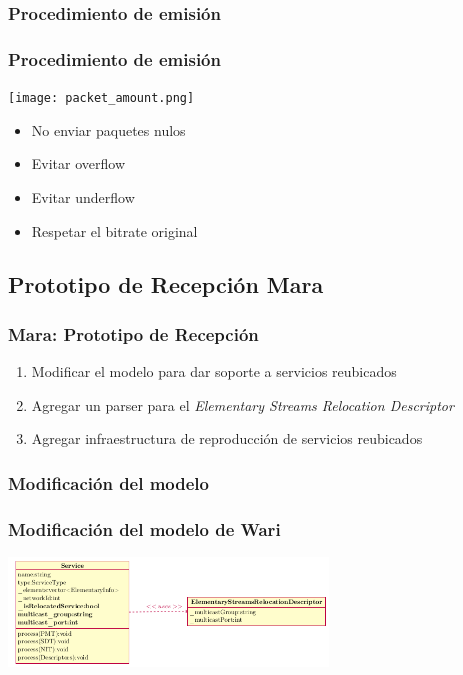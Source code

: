 \documentclass[a4paper,11pt]{beamer}
\begin{document}
		\subsubsection{Procedimiento de emisión}
			\begin{frame}
			\frametitle{Procedimiento de emisión}
			\texttt{[image: packet\_amount.png]}
			\begin{itemize}
				\item No enviar paquetes nulos
				\item Evitar overflow
				\item Evitar underflow
				\item Respetar el bitrate original
			\end{itemize}
		\end{frame}

	\subsection{Prototipo de Recepción Mara}
		\begin{frame}
			\frametitle{Mara: Prototipo de Recepción}
			\begin{enumerate}
				\item Modificar el modelo para dar soporte a servicios reubicados
				\item Agregar un parser para el \emph{Elementary Streams Relocation Descriptor}
				\item Agregar infraestructura de reproducción de servicios reubicados
			\end{enumerate}
		\end{frame}

		\subsubsection{Modificación del modelo}
		\begin{frame}
			\frametitle{Modificación del modelo de Wari}
			\begin{center}
				\includegraphics[width=8.5cm]{service_new_model.png}
			\end{center}
		\end{frame}
\end{document}
